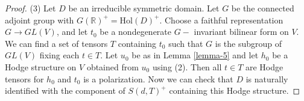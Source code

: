 \begin{proof}
(3) Let $D$ be an irreducible symmetric domain.  Let $G$ be the connected adjoint group with $G(\mathbb R)^+=\text{Hol}(D)^+$. Choose a faithful representation $G \to GL(V)$, and let $t_0$ be a nondegenerate $G-$ invariant bilinear form on $V$. We can find a set of tensors $T$ containing $t_0$ such that $G$ is the subgroup of $GL(V)$ fixing each $t \in T$. Let $u_0$ be as in Lemma \ref{lemma-5} and let $h_0$ be a Hodge structure on $V$ obtained from $u_0$ using (2). Then all $t \in T$ are Hodge tensors for $h_0$ and $t_0$ is a polarization. Now we can check that $D$ is naturally identified with the component of $S(d,T)^+$ containing this Hodge structure. 
\end{proof}



 




















